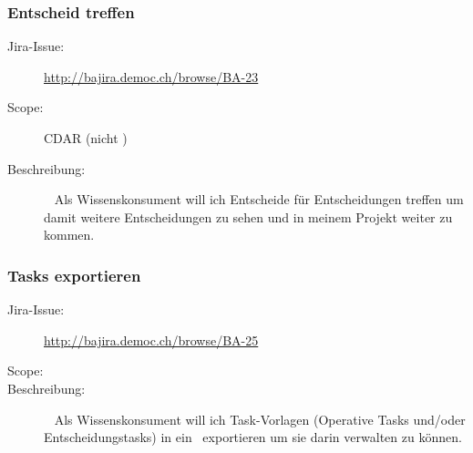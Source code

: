 	\subsubsection{Entscheid treffen}
		\begin{description}
			\item[Jira-Issue:] \url{http://bajira.democ.ch/browse/BA-23}
			\item[Scope:] CDAR (nicht \eeppi)
			\item[Beschreibung:]\ \newline
				Als Wissenskonsument\newline
				will ich Entscheide für Entscheidungen treffen\newline
				um damit weitere Entscheidungen zu sehen und in meinem Projekt weiter zu kommen.
		\end{description}

	\subsubsection{Tasks exportieren}
		\begin{description}
			\item[Jira-Issue:] \url{http://bajira.democ.ch/browse/BA-25}
			\item[Scope:] \eeppi
			\item[Beschreibung:]\ \newline
				Als Wissenskonsument\newline
				will ich Task-Vorlagen (Operative Tasks und/oder Entscheidungstasks) in ein \ppt\ exportieren\newline
				um sie darin verwalten zu können.
		\end{description}

	

